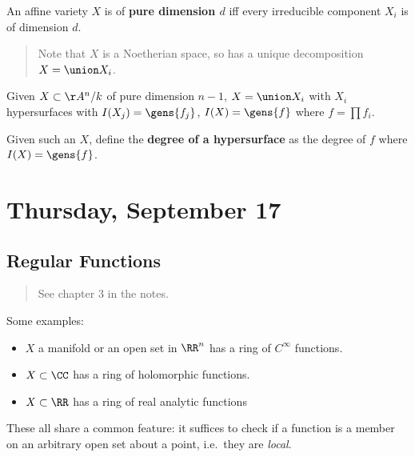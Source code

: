 \begin{definition}[?]

An affine variety \(X\) is of \textbf{pure dimension \(d\)} iff every
irreducible component \(X_i\) is of dimension \(d\).

\end{definition}

\begin{quote}
Note that \(X\) is a Noetherian space, so has a unique decomposition
\(X = \union X_i\).
\end{quote}

Given \(X\subset \AA^n/k\) of pure dimension \(n-1\), \(X = \union X_i\)
with \(X_i\) hypersurfaces with \(I(X_j) = \gens{f_j}\),
\(I(X) = \gens{f}\) where \(f = \prod f_i\).

\begin{definition}[?]

Given such an \(X\), define the \textbf{degree of a hypersurface} as the
degree of \(f\) where \(I(X) = \gens{f}\).

\end{definition}

\hypertarget{thursday-september-17}{%
\section{Thursday, September 17}\label{thursday-september-17}}

\hypertarget{regular-functions}{%
\subsection{Regular Functions}\label{regular-functions}}

\begin{quote}
See chapter 3 in the notes.
\end{quote}

Some examples:

\begin{itemize}
\tightlist
\item
  \(X\) a manifold or an open set in \(\RR^n\) has a ring of
  \(C^\infty\) functions.
\item
  \(X \subset \CC\) has a ring of holomorphic functions.
\item
  \(X\subset \RR\) has a ring of real analytic functions
\end{itemize}

These all share a common feature: it suffices to check if a function is
a member on an arbitrary open set about a point, i.e.~they are
\emph{local}.

